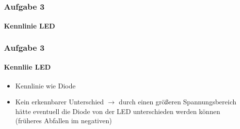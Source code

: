 \begin{frame}
\frametitle{Aufgabe 3}
\framesubtitle{Kennlinie LED}
    \begin{figure}[H]
    \begin{center}
    \end{center}
    \end{figure}

\end{frame}
\begin{frame}
\frametitle{Aufgabe 3}
\framesubtitle{Kennliie LED}
\begin{itemize}
    \item Kennlinie wie Diode
    \item Kein erkennbarer Unterschied
    $\rightarrow$ durch einen größeren Spannungsbereich hätte eventuell die
    Diode von der LED unterschieden werden können (früheres Abfallen im
    negativen)
\end{itemize}
\end{frame}
